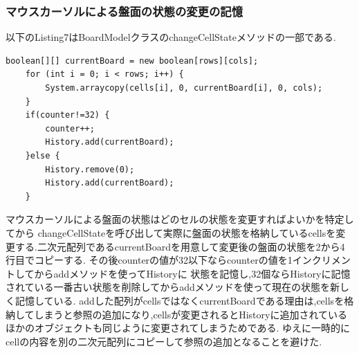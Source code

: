 \documentclass[dvipdfmx]{jarticle}
\begin{document}
\subsubsection{マウスカーソルによる盤面の状態の変更の記憶}
以下のListing7はBoardModelクラスのchangeCellStateメソッドの一部である.
\begin{lstlisting}[caption=changeCellStateメソッドの一部,label=fuga]
    boolean[][] currentBoard = new boolean[rows][cols];
    for (int i = 0; i < rows; i++) {
        System.arraycopy(cells[i], 0, currentBoard[i], 0, cols);
    }
    if(counter!=32) {
        counter++;
        History.add(currentBoard);
    }else {
        History.remove(0);
        History.add(currentBoard);
    }
\end{lstlisting}
マウスカーソルによる盤面の状態はどのセルの状態を変更すればよいかを特定してから
changeCellStateを呼び出して実際に盤面の状態を格納しているcellsを変更する.二次元配列であるcurrentBoardを用意して変更後の盤面の状態を2から4行目でコピーする.
その後counterの値が32以下ならcounterの値を1インクリメントしてからaddメソッドを使ってHistoryに
状態を記憶し,32個ならHistoryに記憶されている一番古い状態を削除してからaddメソッドを使って現在の状態を新しく記憶している.
addした配列がcellsではなくcurrentBoardである理由は,cellsを格納してしまうと参照の追加になり,cellsが変更されるとHistoryに追加されているほかのオブジェクトも同じように変更されてしまうためである.
ゆえに一時的にcellの内容を別の二次元配列にコピーして参照の追加となることを避けた.
\end{document}
